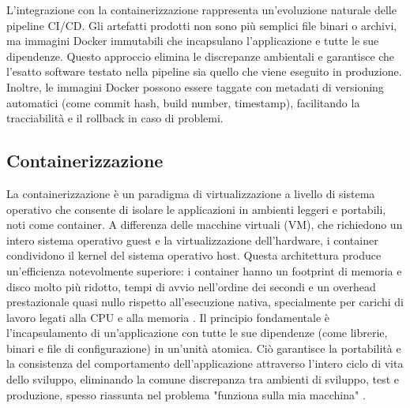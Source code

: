 \documentclass[12pt,a4paper,openright,twoside]{book}
\begin{document}
L'integrazione con la containerizzazione rappresenta un'evoluzione naturale delle pipeline CI/CD. Gli artefatti prodotti non sono più semplici file binari o archivi, ma immagini Docker immutabili che incapsulano l'applicazione e tutte le sue dipendenze. Questo approccio elimina le discrepanze ambientali e garantisce che l'esatto software testato nella pipeline sia quello che viene eseguito in produzione. Inoltre, le immagini Docker possono essere taggate con metadati di versioning automatici (come commit hash, build number, timestamp), facilitando la tracciabilità e il rollback in caso di problemi.

\subsection{Containerizzazione}
La containerizzazione è un paradigma di virtualizzazione a livello di sistema operativo che consente di isolare le applicazioni in ambienti leggeri e portabili, noti come container. A differenza delle macchine virtuali (VM), che richiedono un intero sistema operativo guest e la virtualizzazione dell'hardware, i container condividono il kernel del sistema operativo host. Questa architettura produce un'efficienza notevolmente superiore: i container hanno un footprint di memoria e disco molto più ridotto, tempi di avvio nell'ordine dei secondi e un overhead prestazionale quasi nullo rispetto all'esecuzione nativa, specialmente per carichi di lavoro legati alla CPU e alla memoria \cite{moravcik2024experimental}. Il principio fondamentale è l'incapsulamento di un'applicazione con tutte le sue dipendenze (come librerie, binari e file di configurazione) in un'unità atomica. Ciò garantisce la portabilità e la consistenza del comportamento dell'applicazione attraverso l'intero ciclo di vita dello sviluppo, eliminando la comune discrepanza tra ambienti di sviluppo, test e produzione, spesso riassunta nel problema "funziona sulla mia macchina" \cite{syrjamaki2023exploring}.
\end{document}
